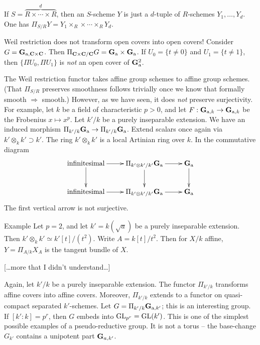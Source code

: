 If $S=\overbrace{R\times \cdots \times R}^d$, then an $S$-scheme $Y$ is just a 
$d$-tuple of $R$-schemes $Y_1,\dots,Y_d$. One has 
$\Pi_{S/R} Y = Y_1\times_R \times \cdots \times_R Y_d$. 

Weil restriction does not transform open covers into open covers! Consider 
$G=\mathbf{G}_{\mathrm{a}, \mathbf{C}\times \mathbf{C}}$. Then 
$\Pi_{\mathbf{C}\times \mathbf{C}/\mathbf{C}} G = \mathbf{G}_{\mathrm{a}} \times \mathbf{G}_{\mathrm{a}}$. If 
$U_0=\{t\ne 0\}$ and $U_1=\{t\ne 1\}$, then 
$\{\Pi U_0,\Pi U_1\}$ is \emph{not} an open cover of $\mathbf{G}_{\mathrm{a}}^2$. 

The Weil restriction functor takes affine group schemes to affine group 
schemes. (That $\Pi_{S/R}$ preserves smoothness follows trivially once we 
know that formally smooth $\Rightarrow$ smooth.) However, as we have seen, 
it does \emph{not} preserve surjectivity. For example, let $k$ be a field 
of characteristic $p>0$, and let $F:\mathbf{G}_{\mathrm{a},k} \to \mathbf{G}_{\mathrm{a},k}$ be the 
Frobenius $x\mapsto x^p$. Let $k'/k$ be a purely inseparable extension. We have 
an induced morphism $\Pi_{k'/k} \mathbf{G}_{\mathrm{a}} \to \Pi_{k'/k} \mathbf{G}_{\mathrm{a}}$. 
Extend scalars once again via $k'\otimes_k k' \supset k'$. The ring 
$k'\otimes_k k'$ is a local Artinian ring over $k$. In the 
commutative diagram 
\[\xymatrix{
  \text{infinitesimal} \ar[r] \ar[d] 
    & \Pi_{k'\otimes k' / k'} \dG_\additive \ar[r] \ar[d] 
    & \dG_\additive \ar[d] \\
  \text{infinitesimal} \ar[r] 
    & \Pi_{k'\otimes k' / k'} \dG_\additive \ar[r] 
    & \dG_\additive
}\]
The first vertical arrow is not surjective. 

\begin{enonce}[remark]{Example}
Let $p=2$, and let $k'=k(\sqrt a)$ be a purely inseparable extension. 
Then $k'\otimes_k k'\simeq k'[t]/(t^2)$. Write $A=k[t]/t^2$. Then for 
$X/k$ affine, $Y=\Pi_{A/k} X_A$ is the tangent bundle of $X$. 

[\ldots more that I didn't understand\ldots ]
\end{enonce}

Again, let $k'/k$ be a purely inseparable extension. The functor 
$\Pi_{k'/k}$ transforms affine covers into affine covers. Moreover, 
$\Pi_{k'/k}$ extends to a functor on quasi-compact separated 
$k'$-schemes. Let $G=\Pi_{k'/k} \mathbf{G}_{\mathrm{a},k'}$; this is an 
interesting group. If $[k':k]=p^r$, then $G$ embeds into 
$\operatorname{GL}_{p^r} = \operatorname{GL}(k')$. This is one of the simplest 
possible examples of a pseudo-reductive group. It is not a torus -- the 
base-change $G_{k'}$ contains a unipotent part $\mathbf{G}_{a,k'}$.





